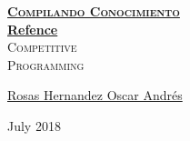 \documentclass[11pt, fleqn]{report}                             %
\author{Oscar Andrés Rosas}                                     %
\theoremstyle{break}                                            %
\begin{document}
\begin{titlepage}
    
    \pagecolor{TitlePageColor}                                      %
    \color{white}                                                   %
    \newcommand{\Github}
    {https://compilandoconocimiento.github.io/Reference/}            %

    \vspace                                                         %
    \baselineskip                                                   %

    \makebox[0pt][l]{\rule{1.3\textwidth}{3pt}}                     %
    
    \href{\Github}                                                  %
    {\textbf{\textsc{\Huge Compilando Conocimiento}}}\\[2.7cm]      %

    \href{\Github/LibroAnalisisVectorial}                           %
    {\fontsize{55}{66}\selectfont                                   %
        \textbf{Refence}}\\[0.5cm]                                  %
    \textcolor{ColorSubtext}
    {\textsc{\Huge Competitive \\ Programming}}                     %
    
    \vfill                                                          %
    
    \href{https://SoyOscarRH.github.io}                            %
    {\LARGE \textsf{Rosas Hernandez Oscar Andrés}}                 %


    \vspace                                                         %
    \baselineskip                                                   %
    
    {\large \textsf{July 2018}}                                    %

\end{titlepage}
\end{document}
